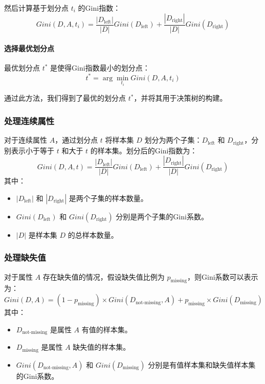 然后计算基于划分点 \(t_i\) 的Gini指数：
\begin{equation}
Gini(D, A, t_i) = \frac{|D_{\text{left}}|}{|D|} Gini(D_{\text{left}}) + \frac{|D_{\text{right}}|}{|D|} Gini(D_{\text{right}})
\end{equation}

\paragraph{选择最优划分点}
最优划分点 \(t^*\) 是使得Gini指数最小的划分点：
\begin{equation}
t^* = \arg\min_{t_i} Gini(D, A, t_i)
\end{equation}

通过此方法，我们得到了最优的划分点 \(t^*\)，并将其用于决策树的构建。






\subsubsection{处理连续属性}
对于连续属性 \(A\)，通过划分点 \(t\) 将样本集 \(D\) 划分为两个子集：\(D_{\text{left}}\) 和 \(D_{\text{right}}\)，分别表示小于等于 \(t\) 和大于 \(t\) 的样本集。划分后的Gini指数为：
\begin{equation}
Gini(D, A, t) = \frac{|D_{\text{left}}|}{|D|} Gini(D_{\text{left}}) + \frac{|D_{\text{right}}|}{|D|} Gini(D_{\text{right}})
\end{equation}
其中：
\begin{itemize}
  \item \(|D_{\text{left}}|\) 和 \(|D_{\text{right}}|\) 是两个子集的样本数量。
  \item \(Gini(D_{\text{left}})\) 和 \(Gini(D_{\text{right}})\) 分别是两个子集的Gini系数。
  \item \(|D|\) 是样本集 \(D\) 的总样本数量。
\end{itemize}
\vspace*{1cm}
\subsubsection{处理缺失值}
对于属性 \(A\) 存在缺失值的情况，假设缺失值比例为 \(p_{\text{missing}}\)，则Gini系数可以表示为：
\begin{equation}
Gini(D, A) = (1 - p_{\text{missing}}) \times Gini(D_{\text{not-missing}}, A) + p_{\text{missing}} \times Gini(D_{\text{missing}})
\end{equation}
其中：
\begin{itemize}
  \item \(D_{\text{not-missing}}\) 是属性 \(A\) 有值的样本集。
  \item \(D_{\text{missing}}\) 是属性 \(A\) 缺失值的样本集。
  \item \(Gini(D_{\text{not-missing}}, A)\) 和 \(Gini(D_{\text{missing}})\) 分别是有值样本集和缺失值样本集的Gini系数。
\end{itemize}
\vspace*{1cm}
